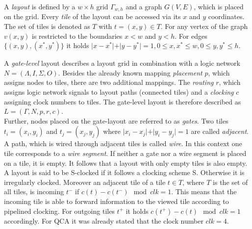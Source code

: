 \begin{definition}
	A \textit{layout} is defined by a $w \times h$ grid $\Gamma_{w, h}$ and a graph $G(V, E)$, which is placed on the grid. Every \textit{tile} of the layout can be accessed via its $x$ and $y$ coordinates. The set of tiles is denoted as $T$ with $t = (x, y) \in T$. For any vertex of the graph $v(x, y)$ is restricted to the boundaries $x < w$ and $y < h$. For edges $\{(x, y), (x^*, y^*)\}$ it holds $\vert x-x^*\vert+\vert y-y^*\vert = 1, 0 \leq x, x^* \leq w, 0 \leq y, y^* \leq h$.
\end{definition}

\begin{definition}
	A \textit{gate-level} layout describes a layout grid in combination with a logic network $N = (\Lambda, I, \Sigma, O)$. Besides the already known mapping \textit{placement} $p$, which assigns nodes to tiles, there are two additional mappings. The \textit{routing} $r$, which assigns logic network signals to layout paths (connected tiles) and a \textit{clocking} $c$ assigning clock numbers to tiles. The gate-level layout is therefore described as $L = (\Gamma, N, p, r, c)$.\\
	Further, nodes placed on the gate-layout are referred to as \textit{gates}. Two tiles $t_i = (x_i, y_i)$ and $t_j = (x_j, y_j)$ where $\vert x_i-x_j\vert+\vert y_i-y_j\vert = 1$ are called \textit{adjacent}. A path, which is wired through adjacent tiles is called \textit{wire}. In this context one tile corresponds to a \textit{wire segment}. If neither a gate nor a wire segment is placed on a tile, it is empty. It follows that a layout with only empty tiles is also empty. A layout is said to be S-clocked if it follows a clocking scheme S. Otherwise it is irregularly clocked. Moreover an adjacent tile of a tile $t \in T$, where $T$ is the set of all tiles, is incoming $t^-$ if $c(t) - c(t^-) \mod{clk} = 1$. This means that the incoming tile is able to forward information to the viewed tile according to pipelined clocking. For outgoing tiles $t^+$ it holds $c(t^+) - c(t) \mod{clk} = 1$ accordingly. For QCA it was already stated that the clock number $clk = 4$.\\
\end{definition}

